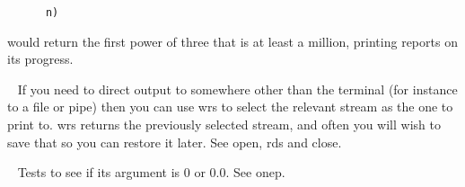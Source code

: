 \begin{description}
{\begin{verbatim}
      n)
\end{verbatim}}
\noindent would return the first power of three that is at least a million,
printing reports on its progress.
\item[{\tx wrs~~~~~~~~~~} \hspace{1cm} {\em function 1 arg}]~\newline
If you need to direct output to somewhere other than the terminal (for instance
to a file or pipe) then you can use {\tx wrs} to select the relevant stream as
the one to print to. {\tx wrs} returns the previously selected stream, and
often you will wish to save that so you can restore it later. See {\tx open},
{\tx rds} and {\tx close}.
\item[{\tx zerop~~~~~~~~} \hspace{1cm} {\em function 1 arg}]~\newline
Tests to see if its argument is 0 or 0.0. See {\tx onep}.
\end{description}
